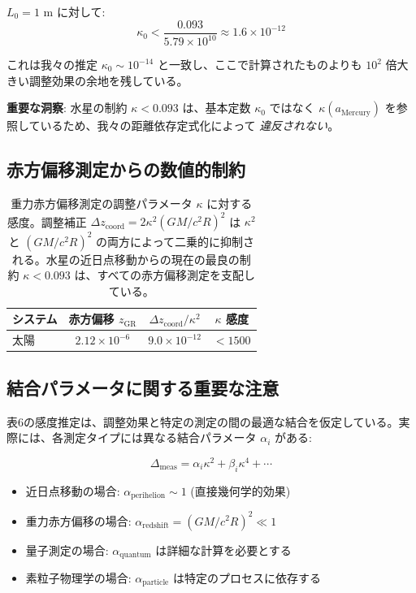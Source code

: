 \documentclass[11pt,a4paper]{article}
\begin{document}
	$L_0 = 1$ m に対して:
	\begin{equation}
		\kappa_0 < \frac{0.093}{5.79 \times 10^{10}} \approx 1.6 \times 10^{-12}
	\end{equation}
	
	これは我々の推定 $\kappa_0 \sim 10^{-14}$ と一致し、ここで計算されたものよりも $10^2$ 倍大きい調整効果の余地を残している。
	
	\textbf{重要な洞察}: 水星の制約 $\kappa < 0.093$ は、基本定数 $\kappa_0$ ではなく $\kappa(a_{\text{Mercury}})$ を参照しているため、我々の距離依存定式化によって \textit{違反されない}。
	
	\subsection{赤方偏移測定からの数値的制約}
	
	\begin{table}[htbp]
		\centering
	
			\begin{tabular}{lccc}
				\toprule
				\textbf{システム} & \textbf{赤方偏移 $z_{\text{GR}}$} & \textbf{$\Delta z_{\text{coord}}/\kappa^2$} & \textbf{$\kappa$ 感度} \\
				\midrule
				太陽 & $2.12\times10^{-6}$ & $9.0\times10^{-12}$ & $<1500$ \\
				\bottomrule
			\end{tabular}
		
		\caption{重力赤方偏移測定の調整パラメータ $\kappa$ に対する感度。調整補正 $\Delta z_{\text{coord}} = 2\kappa^2 (GM/c^2R)^2$ は $\kappa^2$ と $(GM/c^2R)^2$ の両方によって二乗的に抑制される。水星の近日点移動からの現在の最良の制約 $\kappa < 0.093$ は、すべての赤方偏移測定を支配している。}
	\end{table}
	
	\subsection{結合パラメータに関する重要な注意}
	
	表6の感度推定は、調整効果と特定の測定の間の最適な結合を仮定している。実際には、各測定タイプには異なる結合パラメータ $\alpha_i$ がある:
	
	\begin{equation}
		\Delta_{\text{meas}} = \alpha_i \kappa^2 + \beta_i \kappa^4 + \cdots
	\end{equation}
	
	\begin{itemize}
		\item 近日点移動の場合: $\alpha_{\text{perihelion}} \sim 1$ (直接幾何学的効果)
		\item 重力赤方偏移の場合: $\alpha_{\text{redshift}} = (GM/c^2R)^2 \ll 1$
		\item 量子測定の場合: $\alpha_{\text{quantum}}$ は詳細な計算を必要とする
		\item 素粒子物理学の場合: $\alpha_{\text{particle}}$ は特定のプロセスに依存する
	\end{itemize}
	
\end{document}
